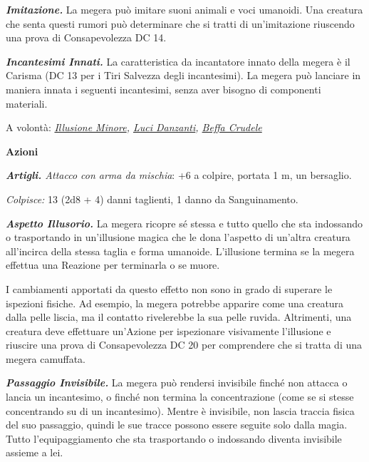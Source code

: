 \begin{multicols}{2}
{\emph{\textbf{Imitazione.}} La megera può imitare suoni animali e voci umanoidi. Una creatura che senta questi rumori può determinare che si tratti di un'imitazione riuscendo una prova di Consapevolezza DC 14.

\emph{\textbf{Incantesimi Innati.}} La caratteristica da incantatore innato della megera è il Carisma (DC 13 per i Tiri Salvezza degli incantesimi). La megera può lanciare in maniera innata i seguenti incantesimi, senza aver bisogno di componenti materiali.

A volontà: \emph{\hyperlink{Illusione Minore}{Illusione Minore}, \hyperlink{Luci Danzanti}{Luci Danzanti}, \hyperlink{Beffa Crudele}{Beffa Crudele}}

\textbf{Azioni}

\emph{\textbf{Artigli.} Attacco con arma da mischia}: +6 a colpire, portata 1 m, un bersaglio.

\emph{Colpisce:} 13 (2d8 + 4) danni taglienti, 1 danno da Sanguinamento.

\emph{\textbf{Aspetto Illusorio.}} La megera ricopre sé stessa e tutto quello che sta indossando o trasportando in un'illusione magica che le dona l'aspetto di un'altra creatura all'incirca della stessa taglia e forma umanoide. L'illusione termina se la megera effettua una Reazione per terminarla o se muore.

I cambiamenti apportati da questo effetto non sono in grado di superare le ispezioni fisiche. Ad esempio, la megera potrebbe apparire come una creatura dalla pelle liscia, ma il contatto rivelerebbe la sua pelle ruvida. Altrimenti, una creatura deve effettuare un'Azione per ispezionare visivamente l'illusione e riuscire una prova di Consapevolezza DC 20 per comprendere che si tratta di una megera camuffata.

\emph{\textbf{Passaggio Invisibile.}} La megera può rendersi invisibile finché non attacca o lancia un incantesimo, o finché non termina la concentrazione (come se si stesse concentrando su di un incantesimo). Mentre è invisibile, non lascia traccia fisica del suo passaggio, quindi le sue tracce possono essere seguite solo dalla magia. Tutto l'equipaggiamento che sta trasportando o indossando diventa invisibile assieme a lei.

}
\end{multicols}
